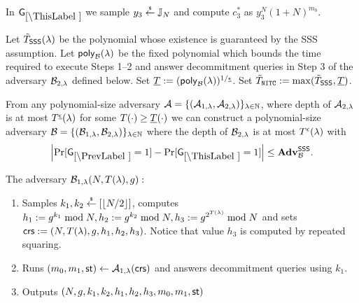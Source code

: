 %


In $\games_\thisgame$ we sample $y_3 \stackrel{{\scriptscriptstyle\$}}{\leftarrow} \mathbb{J}_N$ and compute $c_3^*$ as $y_3^N (1+N)^{m_b}$.

Let $\tilde{T}_\mathsf{SSS}(\lambda)$ be the polynomial whose existence is guaranteed by the SSS assumption.
Let $\mathsf{poly}_{\mathcal{B}}(\lambda)$ be the fixed polynomial which bounds the time required to execute Steps 1--2 and answer decommitment queries in Step 3 of the adversary $\mathcal{B}_{2, \lambda}$ defined below. Set $\underline{T} := (\mathsf{poly}_{\mathcal{B}}(\lambda))^{1 / \underline{\epsilon}}$.  Set $\tilde{T}_{\mathtt{NITC}} := \max(\tilde{T}_\mathsf{SSS}, \underline{T})$.
\begin{lemma}
From any polynomial-size adversary $\mathcal{A} = \{(\mathcal{A}_{1,\lambda}, \mathcal{A}_{2, \lambda})\}_{\lambda \in \mathbb{N}}$, where depth of $\mathcal{A}_{2, \lambda}$ is at most $T^{\underline{\epsilon}}(\lambda)$ for some $T(\cdot) \geq \underline{T}(\cdot)$ we can construct a polynomial-size adversary $\mathcal{B} = \{(\mathcal{B}_{1,\lambda}, \mathcal{B}_{2, \lambda})\}_{\lambda \in \mathbb{N}}$ where the depth of $\mathcal{B}_{2, \lambda}$ is at most $T^{\epsilon}(\lambda)$ with
\[
\left|\Pr[\games_\prevgame = 1] - \Pr[\games_\thisgame = 1]\right| \leq \advtg_\advB^\sss.
\]
\end{lemma}

The adversary $\mathcal{B}_{1,\lambda}(N, T(\lambda), g):$
\vspace{-2mm}
\begin{enumerate}
\item Samples $k_1, k_2 \stackrel{{\scriptscriptstyle\$}}{\leftarrow} [\left\lfloor N/2 \right\rfloor]$, computes $h_1 := g^{k_1} \bmod N, h_2 := g^{k_2} \bmod N,  h_3 := g^{2^{T(\lambda)}} \bmod N$ and sets $\mathsf{crs}:=(N, T(\lambda), g, h_1, h_2, h_3)$. Notice that value $h_3$ is computed by repeated squaring.
\item Runs $(m_0, m_1, \mathsf{st}) \leftarrow \mathcal{A}_{1, \lambda}(\mathsf{crs})$ and answers decommitment queries using $k_1$.
\item Outputs $(N,g,k_1, k_2, h_1,h_2,h_3, m_0, m_1, \mathsf{st})$
\end{enumerate}

